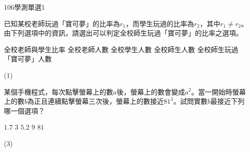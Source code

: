 \begin{QUESTIONS}
\begin{QUESTION}
    \begin{ExamInfo}{106}{學測}{單選}{1}
    \end{ExamInfo}
    \begin{QBODY}
        已知某校老師玩過「寶可夢」的比率為${{r}_{1}}$，而學生玩過的比率為${{r}_{2}}$，其中${{r}_{1}}\ne {{r}_{2}}$。
        由下列選項中的資訊，請選出可以判定全校師生玩過「寶可夢」的比率之選項。
        \begin{QOPS}
            \QOP 全校老師與學生比率     
            \QOP 全校老師人數
            \QOP 全校學生人數
            \QOP 全校師生人數
            \QOP 全校師生玩過「寶可夢」人數
        \end{QOPS}
    \end{QBODY}
    \begin{QFROMS}
    \end{QFROMS}
    \begin{QTAGS}
    \end{QTAGS}
    \begin{QANS}
        (1)
    \end{QANS}
    \begin{QSOL}
    \end{QSOL}
    \begin{QEMPTYSPACE}
    \end{QEMPTYSPACE}
\end{QUESTION}
\begin{QUESTION}
    \begin{QBODY}
        某個手機程式，每次點擊螢幕上的數$a$後，螢幕上的數會變成${{a}^{2}}$。當一開始時螢幕上的數$b$為正且連續點擊螢幕三次後，螢幕上的數接近${{81}^{3}}$。試問實數$b$最接近下列哪一個選項？
        \begin{QOPS}
            \QOP $1.7$      
            \QOP $3$      
            \QOP $5.2$      
            \QOP $9$      
            \QOP $81$
        \end{QOPS}
    \end{QBODY}
    \begin{QFROMS}
    \end{QFROMS}
    \begin{QTAGS}
    \end{QTAGS}
    \begin{QANS}
        (3)
    \end{QANS}
    \begin{QSOL}
    \end{QSOL}

\end{QUESTION}
\end{QUESTIONS}
